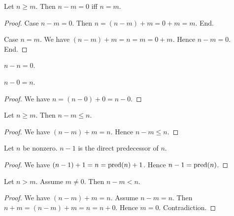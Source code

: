 \documentclass[../../arithmetic.tex]{subfiles}
\begin{document}
  \begin{forthel}
    \begin{proposition}\label{Arithmetic_02_07_297505}
      Let $n \geq m$.
      Then $n - m = 0$ iff $n = m$.
    \end{proposition}
    \begin{proof}
      Case $n - m = 0$.
        Then $n = (n - m) + m = 0 + m = m$.
      End.

      Case $n = m$.
        We have $(n - m) + m = n = m = 0 + m$.
        Hence $n - m = 0$.
      End.
    \end{proof}

    \begin{corollary}\label{Arithmetic_02_07_239083}
      $n - n = 0$.
    \end{corollary}

    \begin{proposition}\label{Arithmetic_02_07_151829}
      $n - 0 = n$.
    \end{proposition}
    \begin{proof}
      We have $n = (n - 0) + 0 = n - 0$.
    \end{proof}

    \begin{proposition}\label{Arithmetic_02_07_236650}
      Let $n \geq m$.
      Then $n - m \leq n$.
    \end{proposition}
    \begin{proof}
      We have $(n - m) + m = n$.
      Hence $n - m \leq n$.
    \end{proof}

    \begin{proposition}\label{Arithmetic_02_07_554898}
      Let $n$ be nonzero.
      $n - 1$ is the direct predecessor of $n$.
    \end{proposition}
    \begin{proof}
      We have $(n - 1) + 1 = n = \operatorname{pred}(n) + 1$.
      Hence $n - 1 = \operatorname{pred}(n)$.
    \end{proof}

    \begin{proposition}\label{Arithmetic_02_07_654395}
      Let $n > m$.
      Assume $m \neq 0$.
      Then $n - m < n$.
    \end{proposition}
    \begin{proof}
      We have $(n - m) + m = n$.
      Assume $n - m = n$.
      Then $n + m = (n - m) + m = n = n + 0$.
      Hence $m = 0$.
      Contradiction.
    \end{proof}


\end{forthel}
\end{document}
